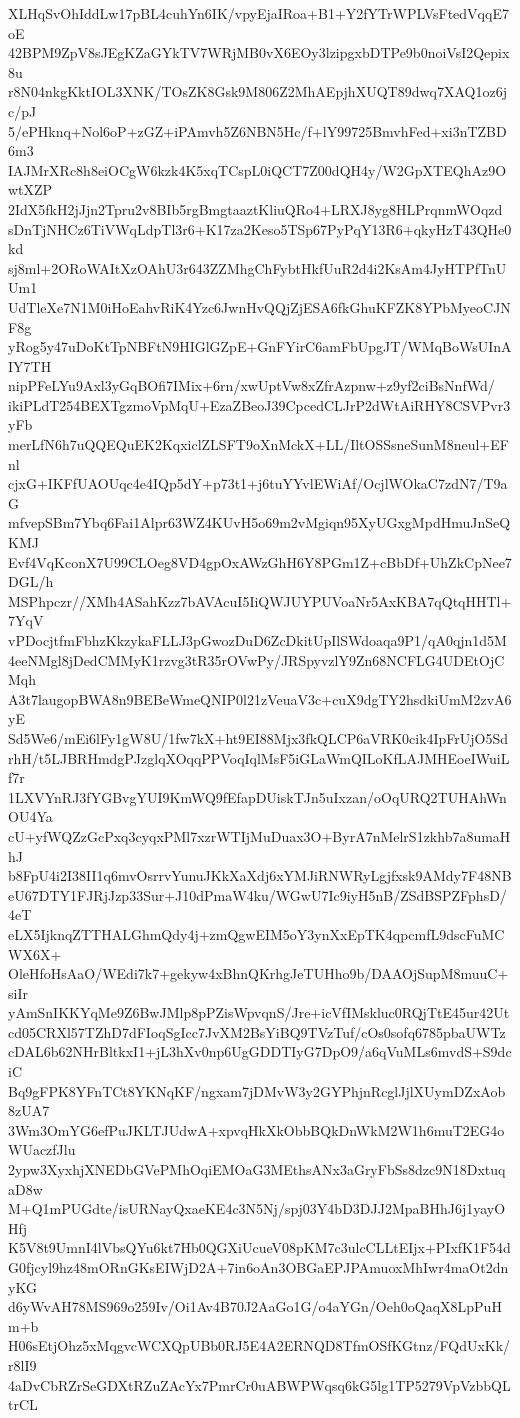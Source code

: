 XLHqSvOhIddLw17pBL4cuhYn6IK/vpyEjaIRoa+B1+Y2fYTrWPLVsFtedVqqE7oE
42BPM9ZpV8sJEgKZaGYkTV7WRjMB0vX6EOy3lzipgxbDTPe9b0noiVsI2Qepix8u
r8N04nkgKktIOL3XNK/TOsZK8Gsk9M806Z2MhAEpjhXUQT89dwq7XAQ1oz6jc/pJ
5/ePHknq+Nol6oP+zGZ+iPAmvh5Z6NBN5Hc/f+lY99725BmvhFed+xi3nTZBD6m3
IAJMrXRc8h8eiOCgW6kzk4K5xqTCspL0iQCT7Z00dQH4y/W2GpXTEQhAz9OwtXZP
2IdX5fkH2jJjn2Tpru2v8BIb5rgBmgtaaztKliuQRo4+LRXJ8yg8HLPrqnmWOqzd
sDnTjNHCz6TiVWqLdpTl3r6+K17za2Keso5TSp67PyPqY13R6+qkyHzT43QHe0kd
sj8ml+2ORoWAItXzOAhU3r643ZZMhgChFybtHkfUuR2d4i2KsAm4JyHTPfTnUUm1
UdTleXe7N1M0iHoEahvRiK4Yzc6JwnHvQQjZjESA6fkGhuKFZK8YPbMyeoCJNF8g
yRog5y47uDoKtTpNBFtN9HIGlGZpE+GnFYirC6amFbUpgJT/WMqBoWsUInAIY7TH
nipPFeLYu9Axl3yGqBOfi7IMix+6rn/xwUptVw8xZfrAzpnw+z9yf2ciBsNnfWd/
ikiPLdT254BEXTgzmoVpMqU+EzaZBeoJ39CpcedCLJrP2dWtAiRHY8CSVPvr3yFb
merLfN6h7uQQEQuEK2KqxiclZLSFT9oXnMckX+LL/IltOSSsneSunM8neul+EFnl
cjxG+IKFfUAOUqc4e4IQp5dY+p73t1+j6tuYYvlEWiAf/OcjlWOkaC7zdN7/T9aG
mfvepSBm7Ybq6Fai1Alpr63WZ4KUvH5o69m2vMgiqn95XyUGxgMpdHmuJnSeQKMJ
Evf4VqKconX7U99CLOeg8VD4gpOxAWzGhH6Y8PGm1Z+cBbDf+UhZkCpNee7DGL/h
MSPhpczr//XMh4ASahKzz7bAVAcuI5IiQWJUYPUVoaNr5AxKBA7qQtqHHTl+7YqV
vPDocjtfmFbhzKkzykaFLLJ3pGwozDuD6ZcDkitUpIlSWdoaqa9P1/qA0qjn1d5M
4eeNMgl8jDedCMMyK1rzvg3tR35rOVwPy/JRSpyvzlY9Zn68NCFLG4UDEtOjCMqh
A3t7laugopBWA8n9BEBeWmeQNIP0l21zVeuaV3c+cuX9dgTY2hsdkiUmM2zvA6yE
Sd5We6/mEi6lFy1gW8U/1fw7kX+ht9EI88Mjx3fkQLCP6aVRK0cik4IpFrUjO5Sd
rhH/t5LJBRHmdgPJzglqXOqqPPVoqIqlMsF5iGLaWmQILoKfLAJMHEoeIWuiLf7r
1LXVYnRJ3fYGBvgYUI9KmWQ9fEfapDUiskTJn5uIxzan/oOqURQ2TUHAhWnOU4Ya
cU+yfWQZzGcPxq3cyqxPMl7xzrWTIjMuDuax3O+ByrA7nMelrS1zkhb7a8umaHhJ
b8FpU4i2I38II1q6mvOsrrvYunuJKkXaXdj6xYMJiRNWRyLgjfxsk9AMdy7F48NB
eU67DTY1FJRjJzp33Sur+J10dPmaW4ku/WGwU7Ic9iyH5nB/ZSdBSPZFphsD/4eT
eLX5IjknqZTTHALGhmQdy4j+zmQgwEIM5oY3ynXxEpTK4qpcmfL9dscFuMCWX6X+
OleHfoHsAaO/WEdi7k7+gekyw4xBhnQKrhgJeTUHho9b/DAAOjSupM8muuC+siIr
yAmSnIKKYqMe9Z6BwJMlp8pPZisWpvqnS/Jre+icVfIMskluc0RQjTtE45ur42Ut
cd05CRXl57TZhD7dFIoqSgIcc7JvXM2BsYiBQ9TVzTuf/cOs0sofq6785pbaUWTz
cDAL6b62NHrBltkxI1+jL3hXv0np6UgGDDTIyG7DpO9/a6qVuMLs6mvdS+S9dciC
Bq9gFPK8YFnTCt8YKNqKF/ngxam7jDMvW3y2GYPhjnRcglJjlXUymDZxAob8zUA7
3Wm3OmYG6efPuJKLTJUdwA+xpvqHkXkObbBQkDnWkM2W1h6muT2EG4oWUaczfJlu
2ypw3XyxhjXNEDbGVePMhOqiEMOaG3MEthsANx3aGryFbSs8dzc9N18DxtuqaD8w
M+Q1mPUGdte/isURNayQxaeKE4c3N5Nj/spj03Y4bD3DJJ2MpaBHhJ6j1yayOHfj
K5V8t9UmnI4lVbsQYu6kt7Hb0QGXiUcueV08pKM7c3ulcCLLtEIjx+PIxfK1F54d
G0fjcyl9hz48mORnGKsEIWjD2A+7in6oAn3OBGaEPJPAmuoxMhIwr4maOt2dnyKG
d6yWvAH78MS969o259Iv/Oi1Av4B70J2AaGo1G/o4aYGn/Oeh0oQaqX8LpPuHm+b
H06sEtjOhz5xMqgvcWCXQpUBb0RJ5E4A2ERNQD8TfmOSfKGtnz/FQdUxKk/r8lI9
4aDvCbRZrSeGDXtRZuZAcYx7PmrCr0uABWPWqsq6kG5lg1TP5279VpVzbbQLtrCL
